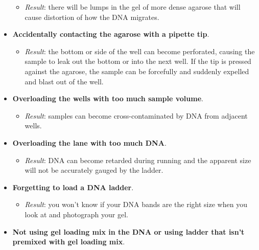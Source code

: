 \documentclass[
  letterpaper,
  DIV=11,
  numbers=noendperiod]{scrreprt}
\providecommand{\tightlist}{%
  \setlength{\itemsep}{0pt}\setlength{\parskip}{0pt}}\usepackage{longtable,booktabs,array}
\begin{document}
\begin{itemize}
  \begin{itemize}
  \tightlist
  \item
    \emph{Result}: there will be lumps in the gel of more dense agarose
    that will cause distortion of how the DNA migrates.
  \end{itemize}
\item
  \textbf{Accidentally contacting the agarose with a pipette tip}.

  \begin{itemize}
  \tightlist
  \item
    \emph{Result}: the bottom or side of the well can become perforated,
    causing the sample to leak out the bottom or into the next well. If
    the tip is pressed against the agarose, the sample can be forcefully
    and suddenly expelled and blast out of the well.
  \end{itemize}
\item
  \textbf{Overloading the wells with too much sample volume}.

  \begin{itemize}
  \tightlist
  \item
    \emph{Result}: samples can become cross-contaminated by DNA from
    adjacent wells.
  \end{itemize}
\item
  \textbf{Overloading the lane with too much DNA}.

  \begin{itemize}
  \tightlist
  \item
    \emph{Result}: DNA can become retarded during running and the
    apparent size will not be accurately gauged by the ladder.
  \end{itemize}
\item
  \textbf{Forgetting to load a DNA ladder}.

  \begin{itemize}
  \tightlist
  \item
    \emph{Result}: you won't know if your DNA bands are the right size
    when you look at and photograph your gel.
  \end{itemize}
\item
  \textbf{Not using gel loading mix in the DNA or using ladder that
  isn't premixed with gel loading mix}.


\end{itemize}
\end{document}
